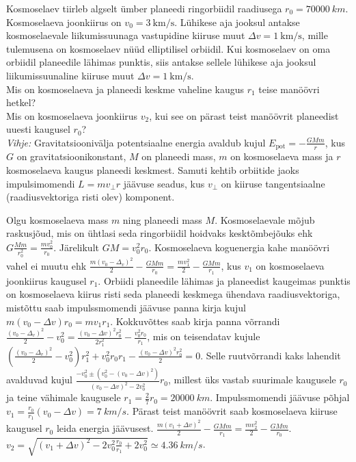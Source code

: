 
Kosmoselaev tiirleb algselt ümber planeedi ringorbiidil raadiusega $r_0=\SI{70000}{km}$. Kosmoselaeva joonkiirus on $v_0=\SI{3}{\km\per\s}$. Lühikese aja jooksul antakse kosmoselaevale liikumissuunaga vastupidine kiiruse muut $\Delta v=\SI{1}{\km\per\s}$, mille tulemusena on kosmoselaev nüüd elliptilisel orbiidil. Kui kosmoselaev on oma orbiidil planeedile lähimas punktis, siis antakse sellele lühikese aja jooksul liikumissuunaline kiiruse muut $\Delta v=\SI{1}{\km\per\s}$.\\
\osa Mis on kosmoselaeva ja planeedi keskme vaheline kaugus $r_1$ teise manöövri hetkel?\\
\osa Mis on kosmoselaeva joonkiirus $v_2$, kui see on pärast teist manöövrit planeedist uuesti kaugusel $r_0$?\\
\emph{Vihje:} Gravitatsioonivälja potentsiaalne energia avaldub kujul $E_\text{pot} = -\frac{GMm}{r}$, kus $G$ on gravitatsioonikonstant, $M$ on planeedi mass, $m$ on kosmoselaeva mass ja $r$ kosmoselaeva kaugus planeedi keskmest. Samuti kehtib orbiitide jaoks impulsimomendi $L=mv_\perp r$ jäävuse seadus, kus $v_\perp$ on kiiruse tangentsiaalne (raadiusvektoriga risti olev) komponent.


\hint

\solu
Olgu kosmoselaeva mass $m$ ning planeedi mass $M$. Kosmoselaevale mõjub raskusjõud, mis on ühtlasi seda ringorbiidil hoidvaks kesktõmbejõuks ehk $G\frac{Mm}{r_0^2}= \frac{mv_0^2}{r_0}$. Järelikult $GM=v_0^2r_0$. Kosmoselaeva koguenergia kahe manöövri vahel ei muutu ehk $\frac{m(v_0-\Delta_v)^2}{2}-\frac{GMm}{r_0}=\frac{mv_1^2}{2}-\frac{GMm}{r_1}$, kus $v_1$ on kosmoselaeva joonkiirus kaugusel $r_1$. Orbiidi planeedile lähimas ja planeedist kaugeimas punktis on kosmoselaeva kiirus risti seda planeedi keskmega ühendava raadiusvektoriga, mistõttu saab impulssmomendi jäävuse panna kirja kujul $m(v_0-\Delta v)r_0=mv_1r_1$. Kokkuvõttes saab kirja panna võrrandi $\frac{(v_0-\Delta_v)^2}{2}-v_0^2=\frac{(v_0-\Delta v)^2r_0^2}{2r_1^2}-\frac{v_0^2r_0}{r_1}$, mis on teisendatav kujule $\left(\frac{(v_0-\Delta_v)^2}{2}-v_0^2\right)r_1^2+v_0^2r_0r_1-\frac{(v_0-\Delta v)^2r_0^2}{2}=0$. Selle ruutvõrrandi kaks lahendit avalduvad kujul $\frac{-v_0^2\pm\left(v_0^2-\left(v_0-\Delta v\right)^2\right)}{\left(v_0-\Delta v\right)^2-2v_0^2}r_0$, millest üks vastab suurimale kaugusele $r_0$ ja teine vähimale kaugusele $r_1=\frac{2}{7}r_0=\SI{20000}{km}$. Impulssmomendi jäävuse põhjal $v_1=\frac{r_0}{r_1}\left(v_0-\Delta v\right)=\SI{7}{km\per s}$. Pärast teist manöövrit saab kosmoselaeva kiiruse kaugusel $r_0$ leida energia jäävusest. $\frac{m(v_1+\Delta v)^2}{2}-\frac{GMm}{r_1}=\frac{mv_2^2}{2}-\frac{GMm}{r_0}$. $v_2=\sqrt{\left(v_1+\Delta v\right)^2-2v_0^2\frac{r_0}{r_1}+2v_0^2}\simeq\SI{4.36}{km\per s}$.
\probend